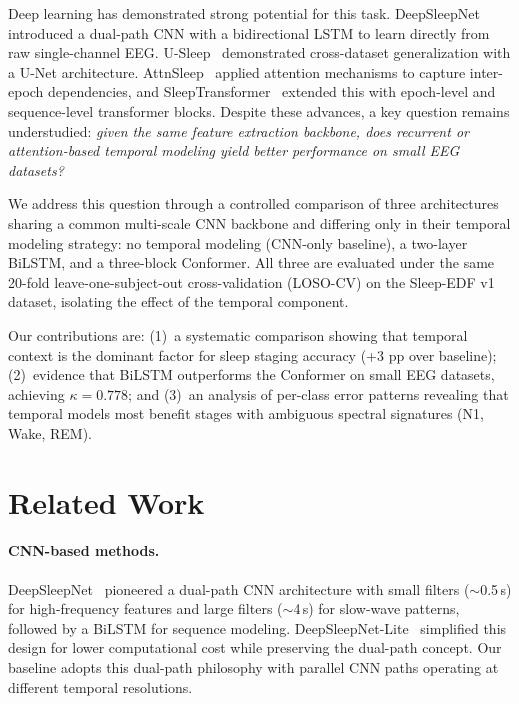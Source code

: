\documentclass[final]{article}
\begin{document}
Deep learning has demonstrated strong potential for this task. DeepSleepNet~\cite{Supratak2017} introduced a dual-path CNN with a bidirectional LSTM to learn directly from raw single-channel EEG. U-Sleep~\cite{Perslev2021} demonstrated cross-dataset generalization with a U-Net architecture. AttnSleep~\cite{Eldele2021} applied attention mechanisms to capture inter-epoch dependencies, and SleepTransformer~\cite{Phan2022} extended this with epoch-level and sequence-level transformer blocks. Despite these advances, a key question remains understudied: \emph{given the same feature extraction backbone, does recurrent or attention-based temporal modeling yield better performance on small EEG datasets?}

We address this question through a controlled comparison of three architectures sharing a common multi-scale CNN backbone and differing only in their temporal modeling strategy: no temporal modeling (CNN-only baseline), a two-layer BiLSTM, and a three-block Conformer. All three are evaluated under the same 20-fold leave-one-subject-out cross-validation (LOSO-CV) on the Sleep-EDF v1 dataset, isolating the effect of the temporal component.

Our contributions are: (1)~a systematic comparison showing that temporal context is the dominant factor for sleep staging accuracy (+3 pp over baseline); (2)~evidence that BiLSTM outperforms the Conformer on small EEG datasets, achieving $\kappa = 0.778$; and (3)~an analysis of per-class error patterns revealing that temporal models most benefit stages with ambiguous spectral signatures (N1, Wake, REM).

\section{Related Work}

\paragraph{CNN-based methods.}
DeepSleepNet~\cite{Supratak2017} pioneered a dual-path CNN architecture with small filters ($\sim$0.5\,s) for high-frequency features and large filters ($\sim$4\,s) for slow-wave patterns, followed by a BiLSTM for sequence modeling. DeepSleepNet-Lite~\cite{Fiorillo2019} simplified this design for lower computational cost while preserving the dual-path concept. Our baseline adopts this dual-path philosophy with parallel CNN paths operating at different temporal resolutions.
\end{document}
